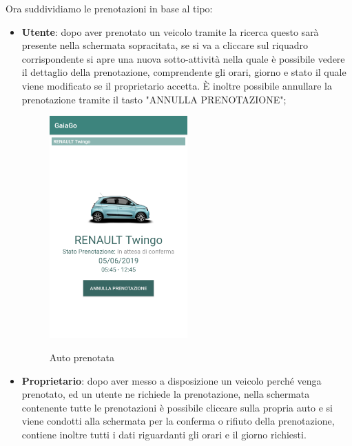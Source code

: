 Ora suddividiamo le prenotazioni in base al tipo:
\begin{itemize}
	\item \textbf{Utente}: dopo aver prenotato un veicolo tramite la ricerca questo sarà presente nella schermata sopracitata, se si va a cliccare sul riquadro corrispondente si apre una nuova sotto-attività nella quale è possibile vedere il dettaglio della prenotazione, comprendente gli orari, giorno e stato il quale viene modificato se il proprietario accetta. È inoltre possibile annullare la prenotazione tramite il tasto "ANNULLA PRENOTAZIONE";
	  \begin{figure}[H] 
		\centering 
		\includegraphics[width=0.5\textwidth]{res/images/prenotazione2.png}\\
		\caption{Auto prenotata}
		\label{prenotata}
	\end{figure}
\pagebreak
	\item \textbf{Proprietario}: dopo aver messo a disposizione un veicolo perché venga prenotato, ed un utente ne richiede la prenotazione, nella schermata contenente tutte le prenotazioni è possibile cliccare sulla propria auto e si viene condotti alla schermata per la conferma o rifiuto della prenotazione, contiene inoltre tutti i dati riguardanti gli orari e il giorno richiesti.
	  \begin{figure}[H] 
		\centering 

\end{figure}
\end{itemize}
